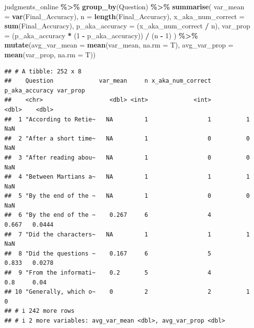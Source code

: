 \documentclass[
]{article}
\newenvironment{Shaded}{\begin{snugshade}}{\end{snugshade}}
\newcommand{\AttributeTok}[1]{\textcolor[rgb]{0.13,0.29,0.53}{#1}}
\newcommand{\DecValTok}[1]{\textcolor[rgb]{0.00,0.00,0.81}{#1}}
\newcommand{\FunctionTok}[1]{\textcolor[rgb]{0.13,0.29,0.53}{\textbf{#1}}}
\newcommand{\NormalTok}[1]{#1}
\newcommand{\SpecialCharTok}[1]{\textcolor[rgb]{0.81,0.36,0.00}{\textbf{#1}}}
\begin{document}
\begin{Shaded}
\begin{Highlighting}[]
\NormalTok{judgments\_online }\SpecialCharTok{\%\textgreater{}\%}
  \FunctionTok{group\_by}\NormalTok{(Question) }\SpecialCharTok{\%\textgreater{}\%}
  \FunctionTok{summarise}\NormalTok{(}
    \AttributeTok{var\_mean =} \FunctionTok{var}\NormalTok{(Final\_Accuracy),}
    \AttributeTok{n =} \FunctionTok{length}\NormalTok{(Final\_Accuracy),}
    \AttributeTok{x\_aka\_num\_correct =} \FunctionTok{sum}\NormalTok{(Final\_Accuracy),}
    \AttributeTok{p\_aka\_accuracy =}\NormalTok{ (x\_aka\_num\_correct }\SpecialCharTok{/}\NormalTok{ n),}
    \AttributeTok{var\_prop =}\NormalTok{ (p\_aka\_accuracy }\SpecialCharTok{*}\NormalTok{ (}\DecValTok{1} \SpecialCharTok{{-}}\NormalTok{ p\_aka\_accuracy)) }\SpecialCharTok{/}\NormalTok{ (n }\SpecialCharTok{{-}} \DecValTok{1}\NormalTok{)}
\NormalTok{  ) }\SpecialCharTok{\%\textgreater{}\%} \FunctionTok{mutate}\NormalTok{(}\AttributeTok{avg\_var\_mean =} \FunctionTok{mean}\NormalTok{(var\_mean, }\AttributeTok{na.rm =}\NormalTok{ T),}
               \AttributeTok{avg\_var\_prop =} \FunctionTok{mean}\NormalTok{(var\_prop, }\AttributeTok{na.rm =}\NormalTok{ T))}
\end{Highlighting}
\end{Shaded}

\begin{verbatim}
## # A tibble: 252 x 8
##    Question             var_mean     n x_aka_num_correct p_aka_accuracy var_prop
##    <chr>                   <dbl> <int>             <int>          <dbl>    <dbl>
##  1 "According to Retie~   NA         1                 1          1     NaN     
##  2 "After a short time~   NA         1                 0          0     NaN     
##  3 "After reading abou~   NA         1                 0          0     NaN     
##  4 "Between Martians a~   NA         1                 1          1     NaN     
##  5 "By the end of the ~   NA         1                 0          0     NaN     
##  6 "By the end of the ~    0.267     6                 4          0.667   0.0444
##  7 "Did the characters~   NA         1                 1          1     NaN     
##  8 "Did the questions ~    0.167     6                 5          0.833   0.0278
##  9 "From the informati~    0.2       5                 4          0.8     0.04  
## 10 "Generally, which o~    0         2                 2          1       0     
## # i 242 more rows
## # i 2 more variables: avg_var_mean <dbl>, avg_var_prop <dbl>
\end{verbatim}
\end{document}

